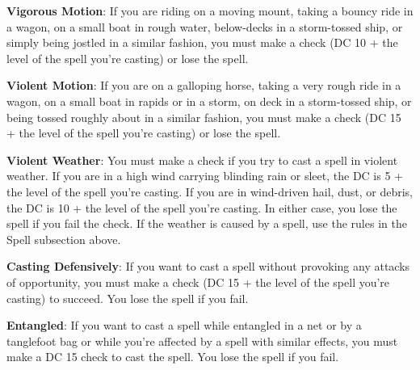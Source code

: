 \textbf{Vigorous Motion}: If you are riding on a moving mount, taking a bouncy ride in a wagon, on a small boat in rough water, below-decks in a storm-tossed ship, or simply being jostled in a similar fashion, you must make a  check (DC 10 + the level of the spell you're casting) or lose the spell.

\textbf{Violent Motion}: If you are on a galloping horse, taking a very rough ride in a wagon, on a small boat in rapids or in a storm, on deck in a storm-tossed ship, or being tossed roughly about in a similar fashion, you must make a  check (DC 15 + the level of the spell you're casting) or lose the spell.

\textbf{Violent Weather}: You must make a  check if you try to cast a spell in violent weather. If you are in a high wind carrying blinding rain or sleet, the DC is 5 + the level of the spell you're casting. If you are in wind-driven hail, dust, or debris, the DC is 10 + the level of the spell you're casting. In either case, you lose the spell if you fail the  check. If the weather is caused by a spell, use the rules in the Spell subsection above.

\textbf{Casting Defensively}: If you want to cast a spell without provoking any attacks of opportunity, you must make a  check (DC 15 + the level of the spell you're casting) to succeed. You lose the spell if you fail.

\textbf{Entangled}: If you want to cast a spell while entangled in a net or by a tanglefoot bag or while you're affected by a spell with similar effects, you must make a DC 15  check to cast the spell. You lose the spell if you fail.